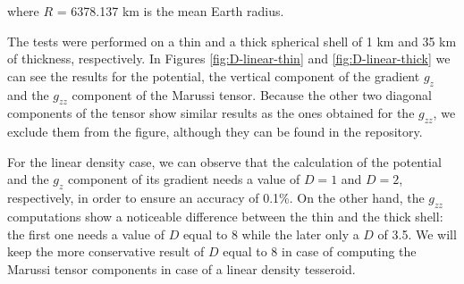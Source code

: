 \documentclass[extra]{gji}
\begin{document}
\noindent where $R$ = 6378.137 km is the mean Earth radius.

The tests were performed on a thin and a thick spherical shell of 1 km and 35 km of thickness, respectively.
In Figures \ref{fig:D-linear-thin} and \ref{fig:D-linear-thick} we can see the results for the potential, the vertical component of the gradient $g_z$ and the $g_{zz}$ component of the Marussi tensor.
Because the other two diagonal components of the tensor show similar results as the ones obtained for the $g_{zz}$, we exclude them from the figure, although they can be found in the repository. 

For the linear density case, we can observe that the calculation of the potential and the $g_z$ component of its gradient needs a value of $D=1$ and $D=2$, respectively, in order to ensure an accuracy of 0.1\%.
On the other hand, the $g_{zz}$ computations show a noticeable difference between the thin and the thick shell: the first one needs a value of $D$ equal to 8 while the later only a $D$ of 3.5.
We will keep the more conservative result of $D$ equal to 8 in case of computing the Marussi tensor components in case of a linear density tesseroid.
\end{document}
